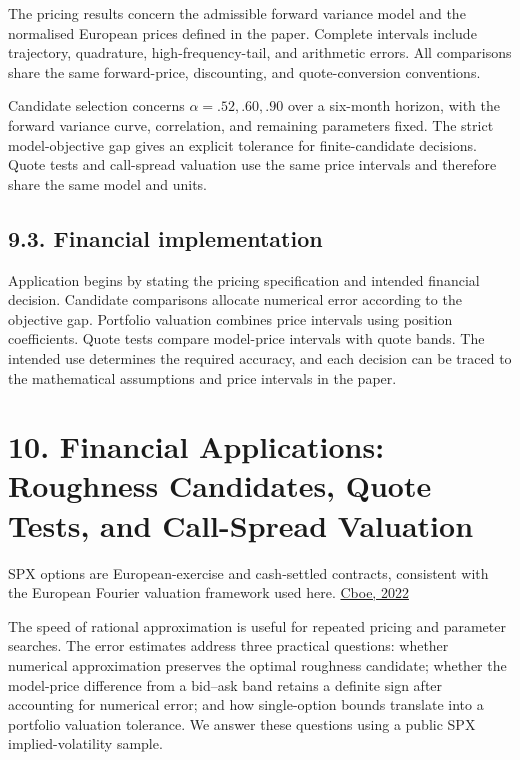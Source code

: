 \documentclass[a4paper,11pt]{article}
\begin{document}
The pricing results concern the admissible forward variance model and the normalised European prices defined in the paper. Complete intervals include trajectory, quadrature, high-frequency-tail, and arithmetic errors. All comparisons share the same forward-price, discounting, and quote-conversion conventions.

Candidate selection concerns \(\alpha=.52,.60,.90\) over a six-month horizon, with the forward variance curve, correlation, and remaining parameters fixed. The strict model-objective gap gives an explicit tolerance for finite-candidate decisions. Quote tests and call-spread valuation use the same price intervals and therefore share the same model and units.

\subsection*{9.3. Financial implementation}

Application begins by stating the pricing specification and intended financial decision. Candidate comparisons allocate numerical error according to the objective gap. Portfolio valuation combines price intervals using position coefficients. Quote tests compare model-price intervals with quote bands. The intended use determines the required accuracy, and each decision can be traced to the mathematical assumptions and price intervals in the paper.

\section*{10. Financial Applications: Roughness Candidates, Quote Tests, and Call-Spread Valuation}

SPX options are European-exercise and cash-settled contracts, consistent with the European Fourier valuation framework used here. \href{https://ir.cboe.com/news/news-details/2022/Cboe-to-Further-Expand-SP-500-Index-Options-Suite-with-New-and-Additional-Daily-Expirations-09-19-2022/default.aspx}{Cboe, 2022}

The speed of rational approximation is useful for repeated pricing and parameter searches. The error estimates address three practical questions: whether numerical approximation preserves the optimal roughness candidate; whether the model-price difference from a bid–ask band retains a definite sign after accounting for numerical error; and how single-option bounds translate into a portfolio valuation tolerance. We answer these questions using a public SPX implied-volatility sample.
\end{document}
